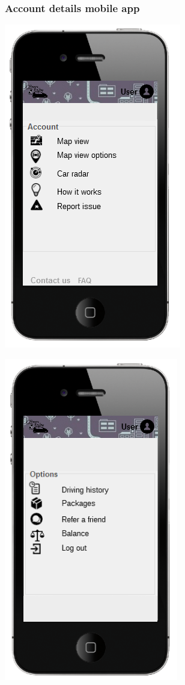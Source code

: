 \subsubsection{Account details mobile app}
\begin{center}
\includegraphics[]{../images/mookup/Account_mobile_sx}

\clearpage
\includegraphics[]{../images/mookup/Account_mobile_dx}
\end{center}

